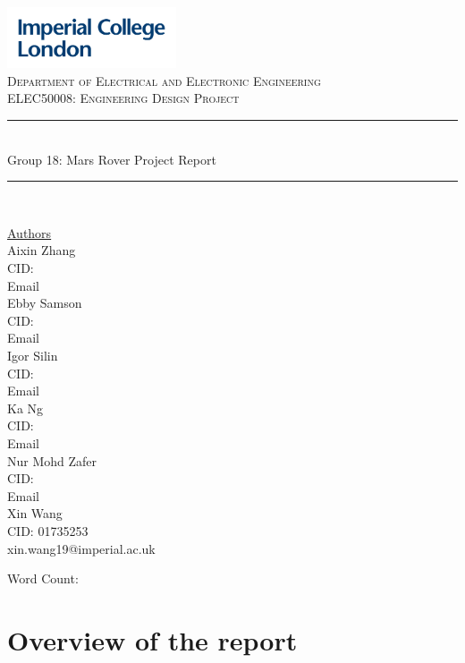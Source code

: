 \documentclass[11pt, a4paper]{article}
\begin{document}
\begin{titlepage}
	\newcommand{\HRule}{\rule{\linewidth}{0.5mm}}
    \includegraphics[width = 5cm]{./Images/Imperial_Logo.jpg} 
    \\
    \center 
	\textsc{\large Department of Electrical and Electronic Engineering }\\[0.5cm] 
	\textsc{\normalsize ELEC50008: Engineering Design Project}\\[0.5cm] 
    
	\HRule \\[0.4cm]
	Group 18: Mars Rover Project Report
    \HRule \\[1.5cm]
     
    \begin{center}
		\underline{Authors}\\[0.5cm] 
        Aixin Zhang \\ CID:  \\ Email \\ [0.5cm]

        Ebby Samson \\ CID:  \\ Email \\ [0.5cm]
        
        Igor Silin \\ CID:  \\ Email \\ [0.5cm]

        Ka Ng \\ CID:  \\ Email \\ [0.5cm]

        Nur Mohd Zafer \\ CID:  \\ Email \\ [0.5cm]    
        
        Xin Wang \\ CID: 01735253 \\ xin.wang19@imperial.ac.uk \\ [0.5cm]

	\end{center} \large
	

    \vfill 
 	\small Word Count:  \\ [0.5cm]
    \makeatletter
    \@date 
    \makeatother
\end{titlepage}

\tableofcontents
\pagebreak

\section{Overview of the report}
\end{document}
